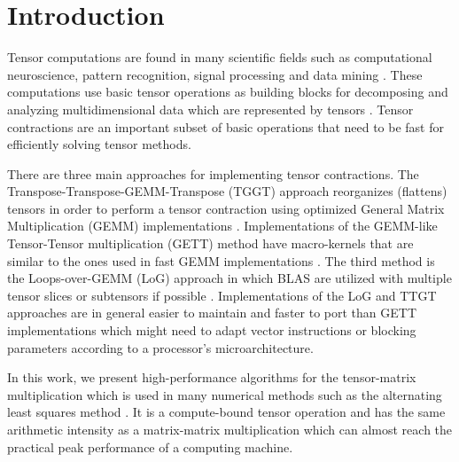 \section{Introduction}
\label{sec:introduction}
Tensor computations are found in many scientific fields such as computational neuroscience, pattern recognition, signal processing and data mining \citep{karahan:2015:tensor,papalexakis:2017:tensors}.
These computations use basic tensor operations as building blocks for decomposing and analyzing multidimensional data which are represented by tensors \citep{lee:2018:fundamental, kolda:2009:decompositions}. 
Tensor contractions are an important subset of basic operations that need to be fast for efficiently solving tensor methods.

There are three main approaches for implementing tensor contractions.
The Transpose-Transpose-GEMM-Transpose (TGGT) approach reorganizes (flattens) tensors in order to perform a tensor contraction using optimized General Matrix Multiplication (GEMM) implementations \citep{bader:2006:algorithm862,solomonik:2013:cyclops}.
Implementations of the GEMM-like Tensor-Tensor multiplication (GETT) method have macro-kernels that are similar to the ones used in fast GEMM implementations \citep{springer:2018:design, matthews:2018:high}.
The third method is the Loops-over-GEMM (LoG) approach in which BLAS are utilized with multiple tensor slices or subtensors if possible \citep{dinapoli:2014:towards.efficient.use, li:2015:input, shi:2016:tensor.contraction, bassoy:2019:ttv}.
Implementations of the LoG and TTGT approaches are in general easier to maintain and faster to port than GETT implementations which might need to adapt vector instructions or blocking parameters according to a processor's microarchitecture.


In this work, we present high-performance algorithms for the tensor-matrix multiplication which is used in many numerical methods such as the alternating least squares method \citep{lee:2018:fundamental, kolda:2009:decompositions}.
It is a compute-bound tensor operation and has the same arithmetic intensity as a matrix-matrix multiplication which can almost reach the practical peak performance of a computing machine.

